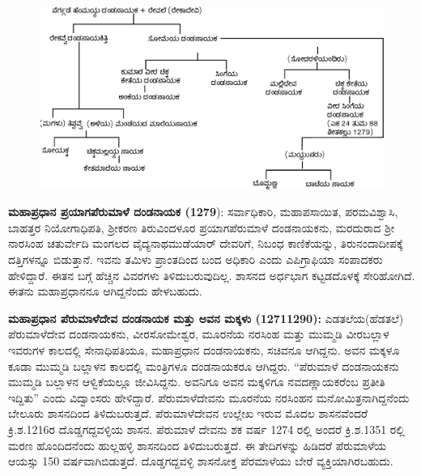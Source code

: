 \begin{figure}[H]
\includegraphics[scale=.8]{images/chap3/chap3fig21.jpeg}
\end{figure}

\textbf{ಮಹಾಪ್ರಧಾನ ಪ್ರಯಾಗಪೆರುಮಾಳೆ ದಂಡನಾಯಕ (1279}): ಸರ್ವಾಧಿಕಾರಿ, ಮಹಾಪಸಾಯಿತ, ಪರಮವಿಶ್ವಾಸಿ, ಬಾಹತ್ತರ ನಿಯೋಗಾಧಿಪತಿ, ಶ‍್ರೀಕರಣ ತಿರುವಿಂದಳೂರ ಪ್ರಯಾಗಪೆರುಮಾಳೆ ದಂಡನಾಯಕನು, ಮರದುರಾದ ಶ‍್ರೀ ನಾರಸಿಂಹ ಚತುರ್ವೇದಿ ಮಂಗಲದ ವೈದ್ಯನಾಥಮುಡೆಯಾರ್​ ದೇವರಿಗೆ, ನಿಬಂಧ ಕಾಣಿಕೆಯನ್ನು, ತಿರುನಂದಾದೀಪಕ್ಕೆ ದತ್ತಿಗಳನ್ನೂ ಬಿಡುತ್ತಾನೆ. ಇವನು ತಮಿಳು ಪ್ರಾಂತದಿಂದ ಬಂದ ಅಧಿಕಾರಿ ಎಂದು ಎಪಿಗ್ರಾಫಿಯಾ ಸಂಪಾದಕರು ಹೇಳಿದ್ದಾರೆ. ಈತನ ಬಗ್ಗೆ ಹೆಚ್ಚಿನ ವಿವರಗಳು ತಿಳಿದುಬರುವುದಿಲ್ಲ. ಶಾಸನದ ಅರ್ಧಭಾಗ ಕಟ್ಟಡದೊಳಕ್ಕೆ ಸೇರಿಹೋಗಿದೆ. ಈತನು ಮಹಾಪ್ರಧಾನನೂ ಆಗಿದ್ದನೆಂದು ಹೇಳಬಹುದು.

\textbf{ಮಹಾಪ್ರಧಾನ ಪೆರುಮಾಳೆದೇವ ದಂಡನಾಯಕ ಮತ್ತು ಅವನ ಮಕ್ಕಳು (1271\general{\enginline{-}}1290):} ಎಡತಲೆಯ(ಹೆಡತಲೆ) ಪೆರುಮಾಳೆದೇವ ದಂಡನಾಯಕನು, ವೀರಸೋಮೇಶ್ವರ, ಮೂರನೆಯ ನರಸಿಂಹ ಮತ್ತು ಮುಮ್ಮಡಿ ವೀರಬಲ್ಲಾಳ ಇವರುಗಳ ಕಾಲದಲ್ಲಿ ಸೇನಾಧಿಪತಿಯೂ, ಮಹಾಪ್ರಧಾನ ದಂಡನಾಯಕನು, ಸಚಿವನೂ ಆಗಿದ್ದನು. ಅವನ ಮಕ್ಕಳೂ ಕೂಡಾ ಮುಮ್ಮಡಿ ಬಲ್ಲಾಳನ ಕಾಲದಲ್ಲಿ ಮಂತ್ರಿಗಳೂ ದಂಡನಾಯಕರೂ ಆಗಿದ್ದರು. “ಪೆರುಮಾಳೆ ದಂಡನಾಯಕನು ಮುಮ್ಮಡಿ ಬಲ್ಲಾಳನ ಆಳ್ವಿಕೆಯಲ್ಲೂ ಜೀವಿಸಿದ್ದನು. ಅವನಿಗೂ ಅವನ ಮಕ್ಕಳಿಗೂ ನವದಣ್ಣಾಯಕರೆಂಬ ಪ್ರತೀತಿ ಇದ್ದಿತು” ಎಂದು ವಿದ್ವಾಂಸರು ಹೇಳಿದ್ದಾರೆ. ಪೆರುಮಾಳೆದೇವನು ಮೂರನೆಯ ನರಸಿಂಹನ ಮನೋಮಿತ್ರನಾಗಿದ್ದನೆಂದು ಬೇಲೂರು ಶಾಸನದಿಂದ ತಿಳಿದುಬರುತ್ತದೆ. ಪೆರುಮಾಳೆದೇವನ ಉಲ್ಲೇಖ ಇರುವ ಮೊದಲ ಶಾಸನವೆಂದರೆ ಕ್ರಿ.ಶ.1216ರ ದೊಡ್ಡಗದ್ದವಳ್ಳಿಯ ಶಾಸನ. ಪೆರುಮಾಳೆ ದೇವನು ಶಕ ವರ್ಷ 1274 ರಲ್ಲಿ ಅಂದರೆ ಕ್ರಿ.ಶ.1351 ರಲ್ಲಿ ಮರಣ ಹೊಂದಿದನೆಂದು ಹುಲ್ಲಹಳ್ಳಿ ಶಾಸನದಿಂದ ತಿಳಿದುಬರುತ್ತದೆ. ಈ ತೇದಿಗಳನ್ನು ಹಿಡಿದರೆ ಪೆರುಮಾಳೆಯ ಆಯಸ್ಸು 150 ವರ್ಷವಾಗಿಬಿಡುತ್ತದೆ. ದೊಡ್ಡಗದ್ದವಳ್ಳಿ ಶಾಸನೋಕ್ತ ಪೆರಮಾಳೆಯು ಬೇರೆ ವ್ಯಕ್ತಿಯಾಗಿರಬಹುದು.

